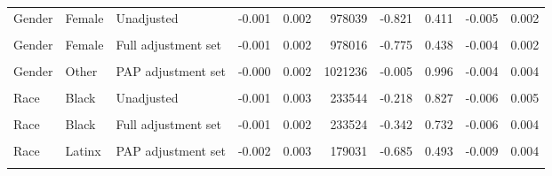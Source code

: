 \begin{table}
\begin{tabular}[t]{lllrrrrrrr}
Gender & Female & Unadjusted & -0.001 & 0.002 & 978039 & -0.821 & 0.411 & -0.005 & 0.002\\
\cellcolor{gray!10}{Gender} & \cellcolor{gray!10}{Female} & \cellcolor{gray!10}{PAP adjustment set} & \cellcolor{gray!10}{-0.001} & \cellcolor{gray!10}{0.002} & \cellcolor{gray!10}{978036} & \cellcolor{gray!10}{-0.812} & \cellcolor{gray!10}{0.417} & \cellcolor{gray!10}{-0.004} & \cellcolor{gray!10}{0.002}\\
Gender & Female & Full adjustment set & -0.001 & 0.002 & 978016 & -0.775 & 0.438 & -0.004 & 0.002\\
\cellcolor{gray!10}{Gender} & \cellcolor{gray!10}{Other} & \cellcolor{gray!10}{Unadjusted} & \cellcolor{gray!10}{0.001} & \cellcolor{gray!10}{0.002} & \cellcolor{gray!10}{1021239} & \cellcolor{gray!10}{0.408} & \cellcolor{gray!10}{0.683} & \cellcolor{gray!10}{-0.003} & \cellcolor{gray!10}{0.005}\\
Gender & Other & PAP adjustment set & -0.000 & 0.002 & 1021236 & -0.005 & 0.996 & -0.004 & 0.004\\
\cellcolor{gray!10}{Gender} & \cellcolor{gray!10}{Other} & \cellcolor{gray!10}{Full adjustment set} & \cellcolor{gray!10}{0.000} & \cellcolor{gray!10}{0.002} & \cellcolor{gray!10}{1021216} & \cellcolor{gray!10}{0.025} & \cellcolor{gray!10}{0.980} & \cellcolor{gray!10}{-0.004} & \cellcolor{gray!10}{0.004}\\
Race & Black & Unadjusted & -0.001 & 0.003 & 233544 & -0.218 & 0.827 & -0.006 & 0.005\\
\cellcolor{gray!10}{Race} & \cellcolor{gray!10}{Black} & \cellcolor{gray!10}{PAP adjustment set} & \cellcolor{gray!10}{-0.001} & \cellcolor{gray!10}{0.002} & \cellcolor{gray!10}{233541} & \cellcolor{gray!10}{-0.513} & \cellcolor{gray!10}{0.608} & \cellcolor{gray!10}{-0.006} & \cellcolor{gray!10}{0.004}\\
Race & Black & Full adjustment set & -0.001 & 0.002 & 233524 & -0.342 & 0.732 & -0.006 & 0.004\\
\cellcolor{gray!10}{Race} & \cellcolor{gray!10}{Latinx} & \cellcolor{gray!10}{Unadjusted} & \cellcolor{gray!10}{-0.003} & \cellcolor{gray!10}{0.004} & \cellcolor{gray!10}{179034} & \cellcolor{gray!10}{-0.818} & \cellcolor{gray!10}{0.413} & \cellcolor{gray!10}{-0.010} & \cellcolor{gray!10}{0.004}\\
Race & Latinx & PAP adjustment set & -0.002 & 0.003 & 179031 & -0.685 & 0.493 & -0.009 & 0.004\\
\cellcolor{gray!10}{Race} & \cellcolor{gray!10}{Latinx} & \cellcolor{gray!10}{Full adjustment set} & \cellcolor{gray!10}{-0.002} & \cellcolor{gray!10}{0.003} & \cellcolor{gray!10}{179014} & \cellcolor{gray!10}{-0.655} & \cellcolor{gray!10}{0.513} & \cellcolor{gray!10}{-0.008} & \cellcolor{gray!10}{0.004}\\

\end{tabular}
\end{table}
